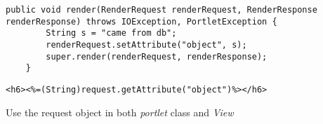 \lstset{language=java}
\begin{minipage}{\linewidth}
\begin{lstlisting}[caption=AwesomePortlet.java]
public void render(RenderRequest renderRequest, RenderResponse renderResponse) throws IOException, PortletException {
        String s = "came from db";
        renderRequest.setAttribute("object", s);
        super.render(renderRequest, renderResponse);
    }
\end{lstlisting}
\end{minipage}

\lstset{language=jsp}
\begin{lstlisting}[caption=view.jsp]
<h6><%=(String)request.getAttribute("object")%></h6>
\end{lstlisting}

Use the request object in both \textit{portlet} class and \textit{View}